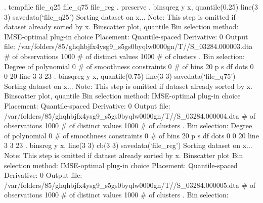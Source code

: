 . tempfile file_q25 file_q75 file_reg
{\smallskip}
. preserve
{\smallskip}
. binsqreg y x, quantile(0.25) line(3 3) savedata(`file_q25')
Sorting dataset on x...
Note: This step is omitted if dataset already sorted by x.
{\smallskip}
Binscatter plot, quantile
Bin selection method: IMSE-optimal plug-in choice
Placement: Quantile-spaced
Derivative: 0
Output file: /var/folders/85/ghqhbjfx4ysg9_s5gs0byqlw0000gn/T//S_03284.000003.dta
{\smallskip}
\# of observations             {\VBAR}    1000
\# of distinct values          {\VBAR}    1000
\# of clusters                 {\VBAR}       .
Bin selection:                {\VBAR} 
         Degree of polynomial {\VBAR}       0
  \# of smoothness constraints {\VBAR}       0
                    \# of bins {\VBAR}      20
{\smallskip}
         {\VBAR}      p       s       df
 dots    {\VBAR}      0       0       20
 line    {\VBAR}      3       3       23
{\smallskip}
. binsqreg y x, quantile(0.75) line(3 3) savedata(`file_q75')
Sorting dataset on x...
Note: This step is omitted if dataset already sorted by x.
{\smallskip}
Binscatter plot, quantile
Bin selection method: IMSE-optimal plug-in choice
Placement: Quantile-spaced
Derivative: 0
Output file: /var/folders/85/ghqhbjfx4ysg9_s5gs0byqlw0000gn/T//S_03284.000004.dta
{\smallskip}
\# of observations             {\VBAR}    1000
\# of distinct values          {\VBAR}    1000
\# of clusters                 {\VBAR}       .
Bin selection:                {\VBAR} 
         Degree of polynomial {\VBAR}       0
  \# of smoothness constraints {\VBAR}       0
                    \# of bins {\VBAR}      20
{\smallskip}
         {\VBAR}      p       s       df
 dots    {\VBAR}      0       0       20
 line    {\VBAR}      3       3       23
{\smallskip}
. binsreg y x, line(3 3) cb(3 3) savedata(`file_reg')
Sorting dataset on x...
Note: This step is omitted if dataset already sorted by x.
{\smallskip}
Binscatter plot
Bin selection method: IMSE-optimal plug-in choice
Placement: Quantile-spaced
Derivative: 0
Output file: /var/folders/85/ghqhbjfx4ysg9_s5gs0byqlw0000gn/T//S_03284.000005.dta
{\smallskip}
\# of observations             {\VBAR}    1000
\# of distinct values          {\VBAR}    1000
\# of clusters                 {\VBAR}       .
Bin selection:                {\VBAR} 
